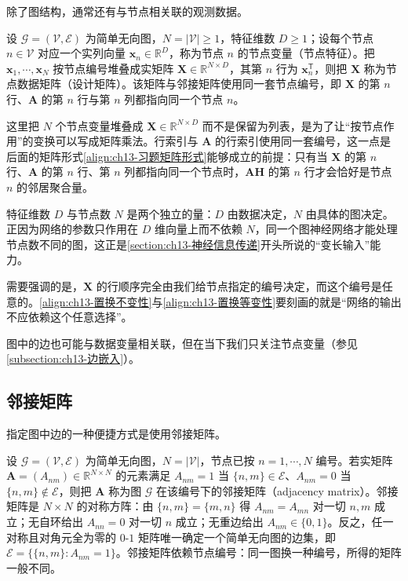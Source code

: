 \documentclass[../../main.tex]{subfiles}
\begin{document}
除了图结构，通常还有与节点相关联的观测数据。

\begin{definition}[节点变量与数据矩阵]\label{definition:ch13-节点数据矩阵}
设 $\mathcal{G}=(\mathcal{V},\mathcal{E})$ 为简单无向图，$N=|\mathcal{V}|\geqslant1$，特征维数 $D\geqslant1$；设每个节点 $n\in\mathcal{V}$ 对应一个实列向量 $\bm{x}_n\in\mathbb{R}^{D}$，称为节点 $n$ 的节点变量（节点特征）。把 $\bm{x}_1,\cdots,\bm{x}_N$ 按节点编号堆叠成实矩阵 $\bm{X}\in\mathbb{R}^{N\times D}$，其第 $n$ 行为 $\bm{x}_n^{\mathsf T}$，则把 $\bm{X}$ 称为节点数据矩阵（设计矩阵）。该矩阵与邻接矩阵使用同一套节点编号，即 $\bm{X}$ 的第 $n$ 行、$\bm{A}$ 的第 $n$ 行与第 $n$ 列都指向同一个节点 $n$。
\end{definition}

\begin{remark}
这里把 $N$ 个节点变量堆叠成 $\bm{X}\in\mathbb{R}^{N\times D}$ 而不是保留为列表，是为了让“按节点作用”的变换可以写成矩阵乘法。行索引与 $\bm{A}$ 的行索引使用同一套编号，这一点是后面的矩阵形式\eqref{align:ch13-习题矩阵形式}能够成立的前提：只有当 $\bm{X}$ 的第 $n$ 行、$\bm{A}$ 的第 $n$ 行、第 $n$ 列都指向同一个节点时，$\bm{A}\bm{H}$ 的第 $n$ 行才会恰好是节点 $n$ 的邻居聚合量。\par
特征维数 $D$ 与节点数 $N$ 是两个独立的量：$D$ 由数据决定，$N$ 由具体的图决定。正因为网络的参数只作用在 $D$ 维向量上而不依赖 $N$，同一个图神经网络才能处理节点数不同的图，这正是\cref{section:ch13-神经信息传递}开头所说的“变长输入”能力。\par
需要强调的是，$\bm{X}$ 的行顺序完全由我们给节点指定的编号决定，而这个编号是任意的。\eqref{align:ch13-置换不变性}与\eqref{align:ch13-置换等变性}要刻画的就是“网络的输出不应依赖这个任意选择”。
\end{remark}

图中的边也可能与数据变量相关联，但在当下我们只关注节点变量（参见\cref{subsection:ch13-边嵌入}）。

\subsection{邻接矩阵}\label{subsection:ch13-邻接矩阵}

指定图中边的一种便捷方式是使用邻接矩阵。

\begin{definition}[邻接矩阵]\label{definition:ch13-邻接矩阵}
设 $\mathcal{G}=(\mathcal{V},\mathcal{E})$ 为简单无向图，$N=|\mathcal{V}|$，节点已按 $n=1,\cdots,N$ 编号。若实矩阵 $\bm{A}=(A_{nm})\in\mathbb{R}^{N\times N}$ 的元素满足 $A_{nm}=1$ 当 $\{n,m\}\in\mathcal{E}$、$A_{nm}=0$ 当 $\{n,m\}\notin\mathcal{E}$，则把 $\bm{A}$ 称为图 $\mathcal{G}$ 在该编号下的邻接矩阵（adjacency matrix）。邻接矩阵是 $N\times N$ 的对称方阵：由 $\{n,m\}=\{m,n\}$ 得 $A_{nm}=A_{mn}$ 对一切 $n,m$ 成立；无自环给出 $A_{nn}=0$ 对一切 $n$ 成立；无重边给出 $A_{nm}\in\{0,1\}$。反之，任一对称且对角元全为零的 $0$-$1$ 矩阵唯一确定一个简单无向图的边集，即 $\mathcal{E}=\{\{n,m\}:A_{nm}=1\}$。邻接矩阵依赖节点编号：同一图换一种编号，所得的矩阵一般不同。
\end{definition}
\end{document}
